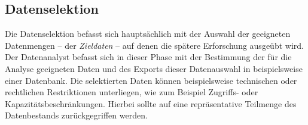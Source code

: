 \subsection{Datenselektion}
Die Datenselektion befasst sich hauptsächlich mit der Auswahl der geeigneten Datenmengen -- der \textit{Zieldaten} -- auf denen die spätere Erforschung ausgeübt wird. Der Datenanalyst befasst sich in dieser Phase mit der Bestimmung der für die Analyse geeigneten Daten und des Exports dieser Datenauswahl in beispielsweise einer Datenbank. Die selektierten Daten können beispielsweise technischen oder rechtlichen Restriktionen unterliegen, wie zum Beispiel Zugriffs- oder Kapazitätsbeschränkungen. Hierbei sollte auf eine repräsentative Teilmenge des Datenbestands zurückgegriffen werden.